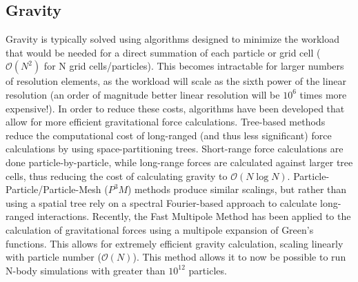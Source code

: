 \subsection{Gravity}
Gravity is typically solved using algorithms designed to minimize the workload
that would be needed for a direct summation of each particle or grid cell
($\mathcal{O}(N^2)$ for N grid cells/particles).  This becomes intractable for
larger numbers of resolution elements, as the workload will scale as the sixth
power of the linear resolution (an order of magnitude better linear resolution
will be $10^6$ times more expensive!).  In order to reduce these costs,
algorithms have been developed that allow for more efficient gravitational
force calculations.  Tree-based methods \citep{Barnes1986} reduce the
computational cost of long-ranged (and thus less significant) force
calculations by using space-partitioning trees.  Short-range force calculations
are done particle-by-particle, while long-range forces are calculated against
larger tree cells, thus reducing the cost of calculating gravity to
$\mathcal{O}(N\log N)$.  Particle-Particle/Particle-Mesh ($P^3M$) methods
\citep{Couchman1991} produce similar scalings, but rather than using a
spatial tree rely on a spectral Fourier-based approach to calculate long-ranged
interactions.  Recently, the Fast Multipole Method \citep{Greengard1987} has
been applied to the calculation of gravitational forces
\citep{Dehnen2002,Hahn2013} using a multipole expansion of Green's functions.
This allows for extremely efficient gravity calculation, scaling linearly with
particle number ($\mathcal{O}(N)$).  This method allows it to now be possible to
run N-body simulations with greater than $10^{12}$ particles\citep{Potter2016}.

